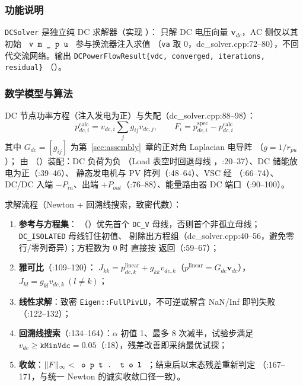 
\subsubsection*{功能说明}
\texttt{DCSolver} 是独立纯 DC 求解器（实现 ）：
只解 DC 电压向量 $\mathbf v_{dc}$，AC 侧仅以其初始 $\fld{vm\_pu}$ 参与换流器注入求值
（\texttt{va} 取 0，dc\_solver.cpp:72--80），不回代交流网络。输出
\texttt{DCPowerFlowResult\{vdc, converged, iterations, residual\}}
（）。

\subsubsection*{数学模型与算法}
DC 节点功率方程（注入发电为正）与失配（dc\_solver.cpp:88--98）：
\[
p_{dc,i}^{\mathrm{calc}}=v_{dc,i}\sum_{j}g_{ij}v_{dc,j},\qquad
F_i=p_{dc,i}^{\mathrm{spec}}-p_{dc,i}^{\mathrm{calc}}
\]
其中 $G_{dc}=[g_{ij}]$ 为第~\ref{sec:assembly}~章的正对角 Laplacian 电导阵
（$g=1/r_{pu}$）； 由 
（）装配：DC 负荷为负
（Load 表空时回退母线 ，:20--37）、DC 储能放电为正（:39--46）、
静态发电机与 PV 阵列（:48--64）、VSC 经 （:66--74）、
DC/DC 入端 $-P_{in}$、出端 $+P_{out}$（:76--88）、能量路由器 DC 端口（:90--100）。

求解流程（Newton + 回溯线搜索，致密代数）：
\begin{enumerate}
  \item \textbf{参考与方程集}：
        （）优先首个
        \texttt{DC\_V} 母线，否则首个非孤立母线；\texttt{DC\_ISOLATED} 母线钉住初值、
        剔除出方程组（dc\_solver.cpp:40--56，避免零行/零列奇异）；方程数为 0 时
        直接按  返回（:59--67）；
  \item \textbf{雅可比}（:109--120）：
        $J_{kk}=p_{dc,k}^{\mathrm{linear}}+g_{kk}v_{dc,k}$（$p^{\mathrm{linear}}=G_{dc}\mathbf v_{dc}$），
        $J_{kl}=g_{kl}v_{dc,k}\ (l\neq k)$；
  \item \textbf{线性求解}：致密 \texttt{Eigen::FullPivLU}，不可逆或解含 NaN/Inf 即判失败
        （:122--132）；
  \item \textbf{回溯线搜索}（:134--164）：$\alpha$ 初值 1、最多 8 次减半，试验步满足
        $v_{dc}\ge\texttt{kMinVdc}=0.05$（:18），残差改善即采纳最优试探；
  \item \textbf{收敛}：$\lVert F\rVert_\infty<\fld{opt.tol}$；结束后以末态残差重新判定
        （:167--171，与统一 Newton 的诚实收敛口径一致）。
\end{enumerate}

